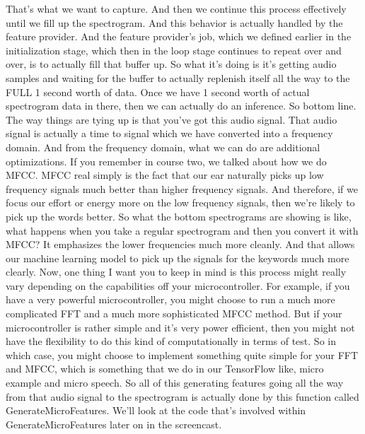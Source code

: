      That's what we want to capture.
     And then we continue this process effectively
     until we fill up the spectrogram.
     And this behavior is actually handled by the feature provider.
     And the feature provider's job, which we defined earlier in the initialization
     stage, which then in the loop stage continues to repeat over and over,
     is to actually fill that buffer up.
     So what it's doing is it's getting audio samples and waiting for the buffer
     to actually replenish itself all the way to the FULL 1 second worth of data.
     Once we have 1 second worth of actual spectrogram data in there,
     then we can actually do an inference.
     So bottom line.
     The way things are tying up is that you've got this audio signal.
     That audio signal is actually a time to signal which we
     have converted into a frequency domain.
     And from the frequency domain, what we can do are additional optimizations.
     If you remember in course two, we talked about how we do MFCC.
     MFCC real simply is the fact that our ear naturally
     picks up low frequency signals much better than higher frequency signals.
     And therefore, if we focus our effort or energy
     more on the low frequency signals, then we're
     likely to pick up the words better.
     So what the bottom spectrograms are showing is like,
     what happens when you take a regular spectrogram
     and then you convert it with MFCC?
     It emphasizes the lower frequencies much more cleanly.
     And that allows our machine learning model
     to pick up the signals for the keywords much more clearly.
     Now, one thing I want you to keep in mind
     is this process might really vary depending
     on the capabilities off your microcontroller.
     For example, if you have a very powerful microcontroller,
     you might choose to run a much more complicated FFT and a much more
     sophisticated MFCC method.
     But if your microcontroller is rather simple and it's very power efficient,
     then you might not have the flexibility to do this kind of computationally
     in terms of test.
     So in which case, you might choose to implement something
     quite simple for your FFT and MFCC, which
     is something that we do in our TensorFlow like, micro example
     and micro speech.
     So all of this generating features going all the way
     from that audio signal to the spectrogram
     is actually done by this function called GenerateMicroFeatures.
     We'll look at the code that's involved within GenerateMicroFeatures later
     on in the screencast.
